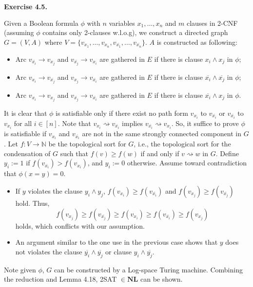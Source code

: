 \documentclass[a4paper]{article}
\newenvironment{exercise}[1]{
	\par
	\noindent\textbf{Exercise #1.}\quad
}{
	\par
	\bigskip
}
\begin{document}
\begin{exercise}{4.5}
    Given a Boolean formula $\phi$ with $n$ variables $x_1, \ldots, x_n$ and $m$ clauses in 2-CNF (assuming $\phi$ contains only 2-clauses w.l.o.g), we construct a directed graph $G = (V,A)$ where $V = \{v_{x_1}, \ldots, v_{x_n}, v_{\overline{x_1}}, \ldots, v_{\overline{x_n}}\}$. $A$ is constructed as following: 
    \begin{itemize}
        \item Arc $v_{\overline{x_i}} \to v_{x_j}$ and $v_{\overline{x_j}} \to v_{x_i}$ are gathered in $E$ if there is clause $x_i \land x_j$ in $\phi$;
        \item Arc $v_{x_i} \to v_{\overline{x_j}}$ and $v_{x_j} \to v_{\overline{x_i}}$ are gathered in $E$ if there is clause $\overline{x_i} \land \overline{x_j}$ in $\phi$;
        \item Arc $v_{x_i} \to v_{x_j}$ and $v_{\overline{x_j}} \to v_{\overline{x_i}}$ are gathered in $E$ if there is clause $\overline{x_i} \land x_j$ in $\phi$.
    \end{itemize}
    It is clear that $\phi$ is satisfiable only if there exist no path form $v_{x_i}$ to $v_{\overline{x_i}}$ or $v_{\overline{x_i}}$ to $v_{x_i}$ for all $i \in [n]$. Note that $v_{x_i} \rightsquigarrow v_{\overline{x_i}}$ implies $v_{\overline{x_i}} \rightsquigarrow v_{x_i}$. So, it suffice to prove $\phi$ is satisfiable if $v_{x_i}$ and $v_{\overline{x_i}}$ are not in the same strongly connected component in $G$. Let $f:V \to \mathbb N$ be the topological sort for $G$, i.e., the topological sort for the condensation of $G$ such that $f(v) \geq f(w)$ if and only if $v \rightsquigarrow w$ in $G$. Define $y_i := 1$ if $f(v_{\overline{x_i}}) > f(v_{x_i})$, and $y_i := 0$ otherwise. Assume toward contradiction that $\phi(x = y) = 0$.
    \begin{itemize}
        \item If $y$ violates the clause $y_i \land y_j$, $f(v_{x_i}) \geq f(v_{\overline{x_i}})$ and $f(v_{x_j}) \geq f(v_{\overline{x_j}})$ hold. Thus, 
        \[
            f(v_{x_j}) \geq f(v_{\overline{x_j}}) \geq f(v_{x_i}) \geq f(v_{\overline{x_i}}) \geq f(v_{{x_j}})
        \]
        holds, which conflicts with our assumption.
        \item An argument similar to the one use in the previous case shows that $y$ does not violates the clause $\overline{y_i} \land \overline{y_j}$ or clause $y_i \land \overline{y_j}$.
    \end{itemize}

    Note given $\phi$, $G$ can be constructed by a Log-space Turing machine. Combining the reduction and Lemma 4.18, 2SAT $\in \mathbf{NL}$ can be shown.
\end{exercise}
\end{document}
